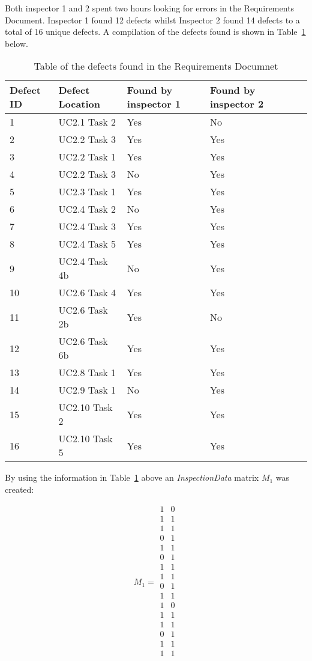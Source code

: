 Both inspector 1 and 2 spent two hours looking for errors in the Requirements Document.
Inspector 1 found 12 defects whilst Inspector 2 found 14 defects to a total of 16 unique defects.
A compilation of the defects found is shown in Table~\ref{defectlist} below.

\begin{table}[!htb]
\centering
\caption{Table of the defects found in the Requirements Documnet}
\label{defectlist}
\begin{tabular}{|l|l|l|l|l|l|}
\hline  Defect ID & Defect Location   & Found by inspector 1  & Found by inspector 2\\ \hline
1       & UC2.1 Task 2  & Yes  & No \\
2       & UC2.2 Task 3   & Yes  & Yes  \\
3       & UC2.2 Task 1   & Yes & Yes      \\
4       & UC2.2 Task 3   & No & Yes   \\
5         & UC2.3 Task 1 & Yes  & Yes     \\
6         & UC2.4 Task 2 & No   & Yes      \\
7         & UC2.4 Task 3 & Yes & Yes      \\
8       & UC2.4 Task 5 & Yes & Yes      \\
9       & UC2.4 Task 4b & No     & Yes   \\
10       & UC2.6 Task 4   & Yes      & Yes    \\
11       & UC2.6 Task 2b & Yes      & No   \\   
12       & UC2.6 Task 6b   & Yes      & Yes    \\
13       & UC2.8 Task 1   & Yes      & Yes    \\
14       & UC2.9 Task 1   & No      & Yes    \\     
15       & UC2.10 Task 2   & Yes      & Yes    \\
16       & UC2.10 Task 5   & Yes      & Yes    \\  \hline     
\end{tabular}
\end{table}

\noindent By using the information in Table~\ref{defectlist} above an \textit{InspectionData} matrix $M_{1}$ was created:



\[
M_{1} =
\begin{array}{cc}
 1 & 0 \\
 1 & 1 \\
 1 & 1 \\
 0 & 1 \\
 1 & 1 \\
 0 & 1 \\
 1 & 1 \\
 1 & 1 \\
 0 & 1 \\
 1 & 1 \\
 1 & 0 \\
 1 & 1 \\
 1 & 1 \\
 0 & 1 \\
 1 & 1 \\
 1 & 1 \\
\end{array}
\]

